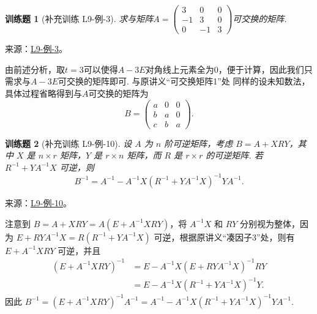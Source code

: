 \documentclass[UTF8,12pt,a4paper,fontset=fandol]{ctexart}
\newtheorem{exercise}{训练题}[section]
\begin{document}
\begin{exercise}[补充训练 L9-例-3]\label{prob:L9-例-3}
求与矩阵$A=\begin{pmatrix}
            3  & 0  & 0 \\
            -1 & 3  & 0 \\
            0  & -1 & 3
        \end{pmatrix}$可交换的矩阵.
\end{exercise}
\noindent 来源：\href{https://github.com/yhwu-is/Linear-Algebra-Left-Undone/blob/new/%E8%AE%B2%E4%B9%89/%E4%B8%93%E9%A2%98/9%20%E7%9F%A9%E9%98%B5%E8%BF%90%E7%AE%97%E8%BF%9B%E9%98%B6.tex}{L9-例-3}。
\begin{solve}
由前述分析，取$t=3$可以使得$A-3E$对角线上元素全为0，便于计算，因此我们只需求与$A-3E$可交换的矩阵即可. 与原讲义“可交换矩阵1”处 同样的设未知数法，具体过程省略得到与$A$可交换的矩阵为
    \[B=\begin{pmatrix}
            a & 0 & 0 \\
            b & a & 0 \\
            c & b & a
        \end{pmatrix}.\]
\end{solve}

\begin{exercise}[补充训练 L9-例-10]\label{prob:L9-例-10}
设 $A$ 为 $n$ 阶可逆矩阵，考虑 $B = A + XRY$，其中 $X$ 是 $n \times r$ 矩阵，$Y$ 是 $r \times n$ 矩阵，而 $R$ 是 $r \times r$ 的可逆矩阵. 若 $R^{-1} + YA^{-1}X$ 可逆，则
    \[B^{-1}=A^{-1}-A^{-1}X(R^{-1}+YA^{-1}X)^{-1}YA^{-1}.\]
\end{exercise}
\noindent 来源：\href{https://github.com/yhwu-is/Linear-Algebra-Left-Undone/blob/new/%E8%AE%B2%E4%B9%89/%E4%B8%93%E9%A2%98/9%20%E7%9F%A9%E9%98%B5%E8%BF%90%E7%AE%97%E8%BF%9B%E9%98%B6.tex}{L9-例-10}。
\begin{solve}
注意到 $B = A + XRY = A(E + A^{-1}XRY)$，将 $A^{-1}X$ 和 $RY$ 分别视为整体，因为 $E + RYA^{-1}X = R(R^{-1} + YA^{-1}X)$ 可逆，根据原讲义“凑因子3”处，则有 $E + A^{-1}XRY$ 可逆，并且
    \begin{align*}
        (E + A^{-1}XRY)^{-1} & = E - A^{-1}X(E + RYA^{-1}X)^{-1}RY \\
                             & = E - A^{-1}X(R^{-1} + YA^{-1}X)^{-1}Y.
    \end{align*}
    因此 $B^{-1} = (E + A^{-1}XRY)^{-1}A^{-1} = A^{-1} - A^{-1}X(R^{-1} + YA^{-1}X)^{-1}YA^{-1}$.
\end{solve}
\end{document}
